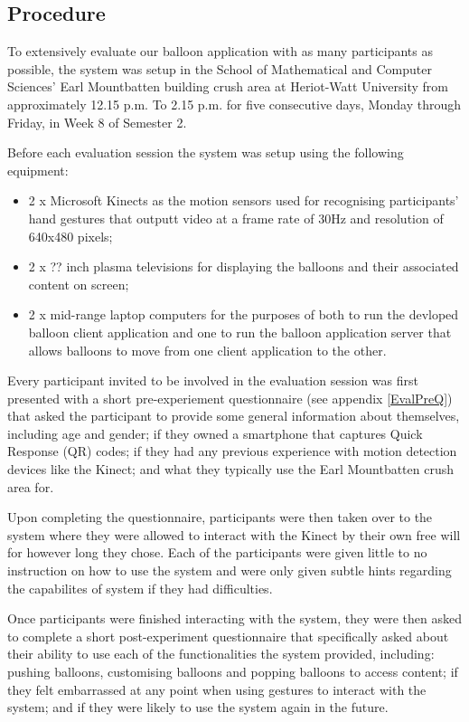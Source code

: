 \subsection{Procedure}

To extensively evaluate our balloon application with as many participants as possible, the system was setup in the School of Mathematical and Computer Sciences'  Earl Mountbatten building crush area at Heriot-Watt University from approximately 12.15 p.m. To 2.15 p.m. for five consecutive days, Monday through Friday, in Week 8 of Semester 2.

Before each evaluation session the system was setup using the following equipment:
\begin{itemize}
\item{2 x Microsoft Kinects as the motion sensors used for recognising participants' hand gestures that outputt video at a frame rate of 30Hz and resolution of 640x480 pixels;}
\item{2 x ?? inch plasma televisions for displaying the balloons and their associated content on screen; }
\item{2 x mid-range laptop computers for the purposes of both to run the devloped balloon client application and one to run the balloon application server that allows balloons to move from one client application to the other.}
\end{itemize}

Every participant invited to be involved in the evaluation session was first presented with a short pre-experiement questionnaire (see appendix \vref{EvalPreQ}) that asked the participant to provide some general information about themselves, including age and gender; if they owned a smartphone that captures Quick Response (QR) codes; if they had any previous experience with motion detection devices like the Kinect; and what they typically use the Earl Mountbatten crush area for.

Upon completing the questionnaire, participants were then taken over to the system where they were allowed to interact with the Kinect by their own free will for however long they chose. Each of the participants were given little to no instruction on how to use the system and were only given subtle hints regarding the capabilites of system if they had difficulties.

Once participants were finished interacting with the system, they were then asked to complete a short post-experiment questionnaire that specifically asked about their ability to use each of the functionalities the system provided, including: pushing balloons, customising balloons and popping balloons to access content; if they felt embarrassed at any point when using gestures to interact with the system; and if they were likely to use the system again in the future.

